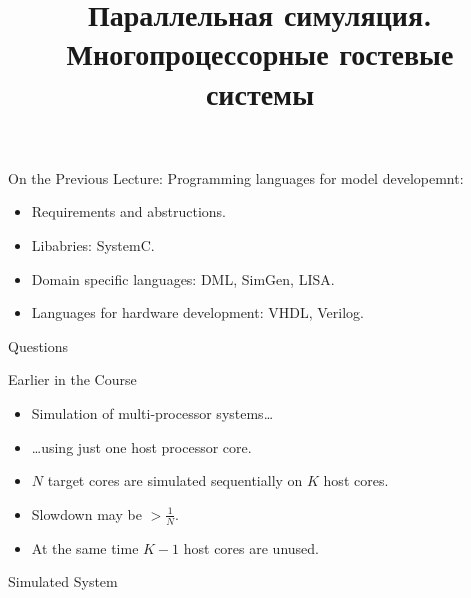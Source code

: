

\title{Параллельная симуляция. Многопроцессорные гостевые системы}



\startslides

\begin{frame}{On the Previous Lecture:}
  Programming languages for model developemnt:
  \begin{itemize}
    \item Requirements and abstructions.
    \item Libabries: SystemC.
    \item Domain specific languages: DML, SimGen, LISA.
    \item Languages for hardware development: VHDL, Verilog.
  \end{itemize}
\end{frame}

\begin{frame}{Questions}
\end{frame}

\begin{frame}{Earlier in the Course}
  \begin{itemize}
   \item Simulation of multi-processor systems\dots\pause
   \item \dots using just one host processor core.
   \vfill
   \item $N$ target cores are simulated sequentially on $K$ host cores.
   \item Slowdown may be $> \frac{1}{N}$.
   \item At the same time $K-1$ host cores are unused.
  \end{itemize}
\end{frame}

\begin{frame}{Simulated System}
  \centering
\end{frame}


